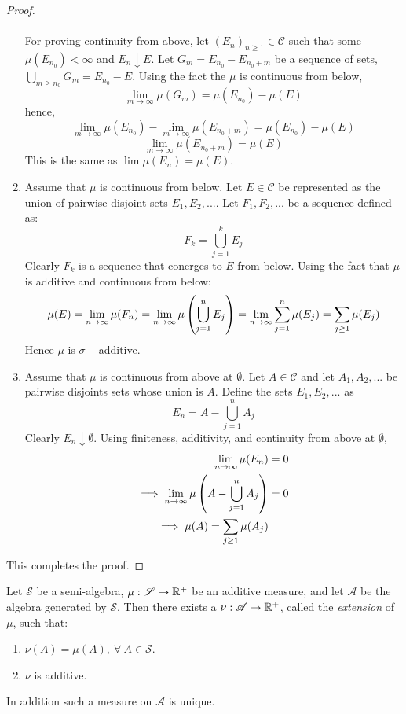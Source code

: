 \begin{proof}
\begin{enumerate}
      \paragraph{} For proving continuity from above, let $(E_n)_{n\geq 1}\in \mathscr{C}$ such that some $\mu(E_{n_0}) <\infty$ and $E_n \downarrow E$. Let $G_m = E_{n_0} - E_{n_0+m}$ be a sequence of sets, $\bigcup_{m\geq n_0} G_m = E_{n_0} - E$. Using the fact the $\mu$ is continuous from below,
      \[\lim_{m\to\infty}\mu(G_m) = \mu(E_{n_0}) - \mu(E)\]
      hence,
      \[\lim_{m\to\infty}\mu(E_{n_0}) - \lim_{m\to\infty}\mu(E_{n_0+m}) = \mu(E_{n_0}) - \mu(E)\]
      \[\lim_{m\to\infty}\mu(E_{n_0+m}) = \mu(E)\]
      This is the same as $\lim \mu(E_n) = \mu(E)$.
    \item Assume that $\mu$ is continuous from below. Let $E\in \mathscr{C}$ be represented as the union of pairwise disjoint sets $E_1, E_2,...$. Let $F_1,F_2,...$ be a sequence defined as:
      \[F_k = \bigcup_{j=1}^{k} E_j\]
      Clearly $F_k$ is a sequence that conerges to $E$ from below. Using the fact that $\mu$ is additive and continuous from below:
      \[\mu(E) = \lim_{n\to\infty}\mu(F_n) = \lim_{n\to\infty} \mu\left(\bigcup_{j=1}^n E_j\right) = \lim_{n\to\infty}\sum_{j=1}^{n}\mu(E_j) = \sum_{j\geq 1}\mu(E_j)\]
      Hence $\mu$ is $\sigma-$additive.
    \item Assume that $\mu$ is continuous from above at $\emptyset$. Let $A\in \mathscr{C}$ and let $A_1, A_2,...$ be pairwise disjoints sets whose union is $A$. Define the sets $E_1, E_2,...$ as
      \[E_n = A - \bigcup_{j=1}^nA_j\]
      Clearly $E_n\downarrow \emptyset$. Using finiteness, additivity, and continuity from above at $\emptyset$,
      \begin{align*}
        \lim_{n\to\infty}\mu(E_n) &= 0\\
        \implies \lim_{n\to\infty} \mu\left(A - \bigcup_{j=1}^nA_j\right) &= 0\\
        \implies \mu(A) = \sum_{j\geq 1} \mu(A_j)
      \end{align*}
  \end{enumerate}
  This completes the proof.
\end{proof}
\begin{theorem}\label{thm:extension}
  Let $ \mathscr{S}$ be a semi-algebra, $\mu: \mathscr{S}\to \mathbb{R}^+$ be an additive measure, and let $ \mathscr{A}$ be the algebra generated by $ \mathscr{S}$. Then there exists a $\nu: \mathscr{A}\to \mathbb{R}^+$, called the \textit{extension} of $\mu$, such that:
  \begin{enumerate}
    \item $\nu(A) = \mu(A),\ \forall\ A\in \mathscr{S}$.
    \item $\nu$ is additive.
  \end{enumerate}
  In addition such a measure on $ \mathscr{A}$ is unique.  
\end{theorem}
%
%
%
